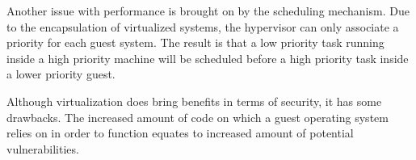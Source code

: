 Another issue with performance is brought on by the scheduling mechanism. Due to the encapsulation of virtualized systems, the hypervisor can only associate a priority for each guest system. The result is that a low priority task running inside a high priority machine will be scheduled before a high priority task inside a lower priority guest\cite{virt-embedded}.

Although virtualization does bring benefits in terms of security, it has some drawbacks. The increased amount of code on which a guest operating system relies on in order to function equates to increased amount of potential vulnerabilities.
